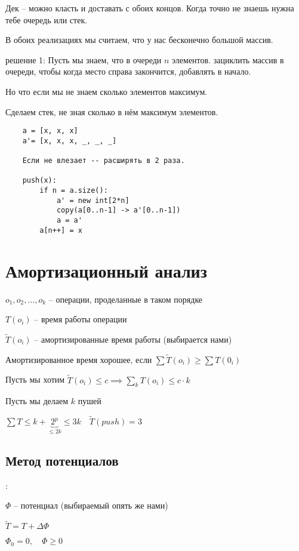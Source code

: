 \documentclass{book}
\theoremstyle{definition}
\begin{document}
\begin{definition}
    Дек -- можно класть и доставать с обоих концов. Когда точно не знаешь нужна тебе очередь или стек.
\end{definition}

В обоих реализациях мы считаем, что у нас бесконечно большой массив.


решение 1: Пусть мы знаем, что в очереди $n$ элементов.
зациклить массив в очереди, чтобы когда место справа закончится, добавлять в начало.

Но что если мы не знаем сколько элементов максимум.

Сделаем стек, не зная сколько в нём максимум элементов.

\begin{verbatim}
    a = [x, x, x]
    a'= [x, x, x, _, _, _]

    Если не влезает -- расширять в 2 раза.

    push(x):
        if n = a.size():
            a' = new int[2*n]
            copy(a[0..n-1] -> a'[0..n-1])
            a = a'
        a[n++] = x
\end{verbatim}

\section{Амортизационный анализ}
$o_1, o_2, \ldots, o_k$ -- операции, проделанные в таком порядке

$T(o_i)$ -- время работы операции

$\widetilde{T}\left(o_i \right) $ -- амортизированные время работы (выбирается нами)

Амортизированное время хорошее, если $\sum \widetilde{T}(o_i) \geqslant \sum T(0_i)$

Пусть мы хотим $\widetilde{T}(o_i)\leqslant c \implies \sum\limits_k T(o_i)\leqslant c\cdot k$

Пусть мы делаем $k$ пушей

$\sum T \leqslant  k + \underbrace{2^p}\limits_{\leqslant 2k} \leqslant 3k\quad \widetilde{T}(push) = 3$

\subsection{Метод потенциалов}:

$\Phi$ -- потенциал (выбираемый опять же нами)

$\widetilde{T} = T + \Delta \Phi$

 $\Phi_0 = 0, \quad \Phi\geqslant 0$
\end{document}
